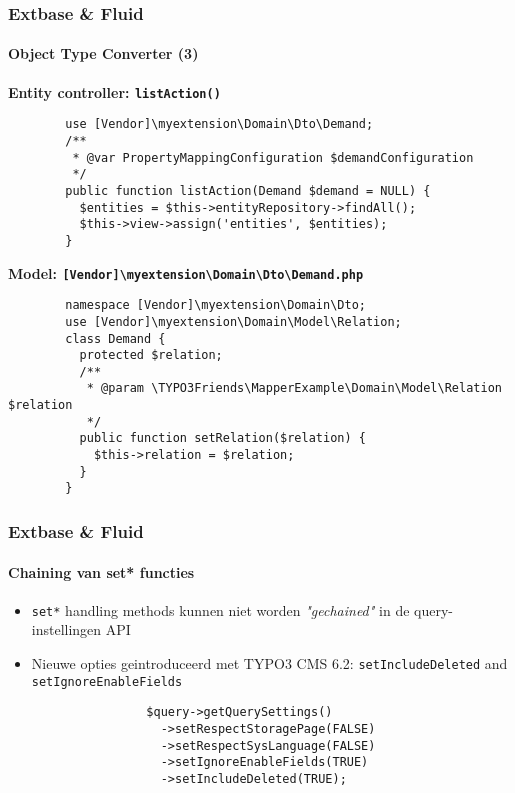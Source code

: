 \begin{frame}[fragile]
	\frametitle{Extbase \& Fluid}
	\framesubtitle{Object Type Converter (3)}

	\lstset{
		basicstyle=\tiny\ttfamily
	}

	\smaller\textbf{Entity controller: \texttt{listAction()}}\normalsize
	\begin{lstlisting}
		use [Vendor]\myextension\Domain\Dto\Demand;
		/**
		 * @var PropertyMappingConfiguration $demandConfiguration
		 */
		public function listAction(Demand $demand = NULL) {
		  $entities = $this->entityRepository->findAll();
		  $this->view->assign('entities', $entities);
		}
	\end{lstlisting}

	\smaller\textbf{Model: \texttt{[Vendor]\textbackslash myextension\textbackslash Domain\textbackslash Dto\textbackslash Demand.php}}\normalsize
	\begin{lstlisting}
		namespace [Vendor]\myextension\Domain\Dto;
		use [Vendor]\myextension\Domain\Model\Relation;
		class Demand {
		  protected $relation;
		  /**
		   * @param \TYPO3Friends\MapperExample\Domain\Model\Relation $relation
		   */
		  public function setRelation($relation) {
		    $this->relation = $relation;
		  }
		}
	\end{lstlisting}

\end{frame}


\begin{frame}[fragile]
	\frametitle{Extbase \& Fluid}
	\framesubtitle{Chaining van set* functies}

	\lstset{
		basicstyle=\tiny\ttfamily
	}

	\begin{itemize}
		\item \texttt{set*} handling methods kunnen niet worden \emph{"gechained"} in de query-instellingen API
		\item Nieuwe opties geintroduceerd met TYPO3 CMS 6.2:\newline
			\texttt{setIncludeDeleted} and \texttt{setIgnoreEnableFields}

			\begin{lstlisting}
				$query->getQuerySettings()
				  ->setRespectStoragePage(FALSE)
				  ->setRespectSysLanguage(FALSE)
				  ->setIgnoreEnableFields(TRUE)
				  ->setIncludeDeleted(TRUE);
			\end{lstlisting}
	\end{itemize}

\end{frame}


